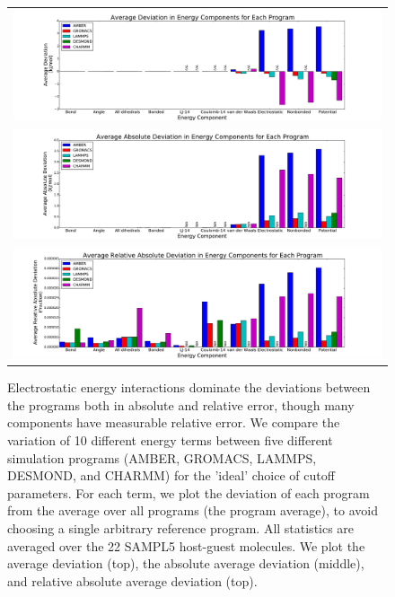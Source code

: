 \begin{figure}[h]
\begin{tabular}{c}
\includegraphics[width=\textwidth]{AverageIdealSettings.pdf} \\  
\includegraphics[width=\textwidth]{AverageAbsoluteIdealSettings.pdf} \\  
\includegraphics[width=\textwidth]{AverageRelativeAbsoluteIdealSettings.pdf}
\end{tabular}
\caption{Electrostatic energy interactions dominate the deviations
  between the programs both in absolute and relative error, though
  many components have measurable relative error. We compare the
  variation of 10 different energy terms between five different
  simulation programs (AMBER, GROMACS, LAMMPS, DESMOND, and CHARMM)
  for the 'ideal' choice of cutoff parameters. For each term, we plot
  the deviation of each program from the average over all programs
  (the program average), to avoid choosing a single arbitrary
  reference program. All statistics are averaged over the 22 SAMPL5
  host-guest molecules. We plot the average deviation (top), the
  absolute average deviation (middle), and relative absolute average
  deviation (top).
\label{fig:mainfig}}
\end{figure}

